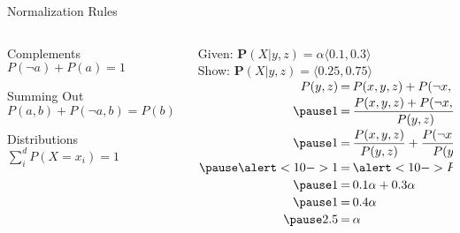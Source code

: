 \documentclass[14pt]{beamer}
\begin{document}
\begin{frame}{Normalization Rules}
	\begin{columns}
		\begin{column}{0.47\textwidth}
			\begin{block}{Complements}
				$P(\lnot a) + P(a) = 1$
			\end{block}
			\begin{block}{Summing Out}
				$P(a, b) + P(\lnot a, b) = P(b)$
			\end{block}
			\begin{block}{Distributions}
				$\sum\limits^{d}_{i}{P(X=x_{i})} = 1$
			\end{block}
		\end{column}
		\pause
		\begin{column}{0.51\textwidth}
			\small
			Given: $\mathbf{P}(X|y,z) = \alpha\langle 0.1, 0.3 \rangle$
			\\ \smallskip
			Show: $\mathbf{P}(X|y,z) = \langle 0.25, 0.75 \rangle$
			\\ \bigskip
			\pause
			$
			\begin{array}{@{}r@{\hspace{.2em}}l@{\hspace{.2em}}l@{}}
			P(y,z) & = & P(x,y,z) + P(\lnot x,y,z) \\[.2em]
			\pause
			1      & = & \displaystyle\frac{P(x,y,z) + P(\lnot x,y,c)}{P(y, z)} \\[.8em]
			\pause
			1      & = & \displaystyle\frac{P(x,y,z)}{P(y, z)} + \frac{P(\lnot x,y,z)}{P(y, z)} \\[.8em]
			\pause
			\alert<10->{1} & = & \alert<10->{P(x|y,z) + P(\lnot x|y,z)} \\[.2em]
			\pause
			1      & = & 0.1\alpha + 0.3\alpha \\[.2em]
			\pause
			1      & = & 0.4\alpha \\[.2em]
			\pause
			2.5    & = & \alpha
			\end{array}
			$
		\end{column}
	\end{columns}
\end{frame}
\end{document}
